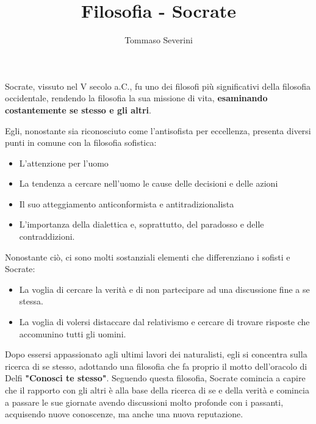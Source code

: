 \documentclass[10pt,a4paper]{article}
\author{Tommaso Severini}
\title{Filosofia - Socrate}
\begin{document}
	\maketitle
	
	Socrate, vissuto nel V secolo a.C., fu uno dei filosofi più significativi della filosofia occidentale, rendendo la filosofia la sua missione di vita, \textbf{esaminando costantemente se stesso e gli altri}.
	
	Egli, nonostante sia riconosciuto come l'antisofista per eccellenza, presenta diversi punti in comune con la filosofia sofistica:
	\begin{itemize}
		\item L'attenzione per l'uomo
		\item La tendenza a cercare nell'uomo le cause delle decisioni e delle azioni
		\item Il suo atteggiamento anticonformista e antitradizionalista
		\item L'importanza della dialettica e, soprattutto, del paradosso e delle contraddizioni.
	\end{itemize}

	Nonostante ciò, ci sono molti sostanziali elementi che differenziano i sofisti e Socrate:
	\begin{itemize}
		\item La voglia di cercare la verità e di non partecipare ad una discussione fine a se stessa.
		\item La voglia di volersi distaccare dal relativismo e cercare di trovare risposte che accomunino tutti gli uomini.
	\end{itemize}

	Dopo essersi appassionato agli ultimi lavori dei naturalisti, egli si concentra sulla ricerca di se stesso, adottando una filosofia che fa proprio il motto dell'oracolo di Delfi \textbf{"Conosci te stesso"}. Seguendo questa filosofia, Socrate comincia a capire che il rapporto con gli altri è alla base della ricerca di se e della verità e comincia a passare le sue giornate avendo discussioni molto profonde con i passanti, acquisendo nuove conoscenze, ma anche una nuova reputazione.
	
\end{document}
